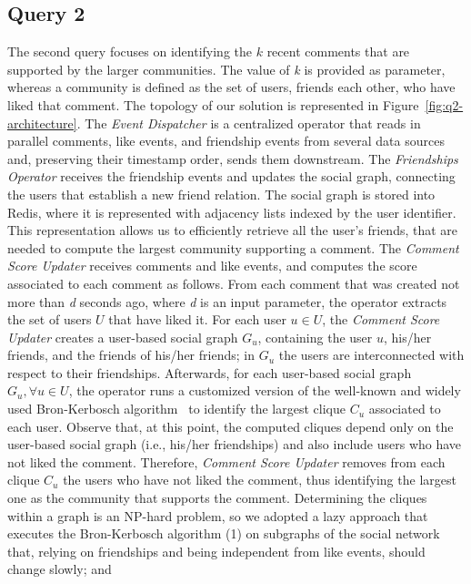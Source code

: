 \subsection{Query 2}
\label{sec:solution-q2}

The second query focuses on identifying the $ k $ recent comments that are supported by the larger communities.
The value of \textit{k} is provided as parameter, whereas a community is defined as the set of users, friends each other, who have liked that comment. 
% 
The topology of our solution is represented in Figure~\ref{fig:q2-architecture}. 
%
The \textit{Event Dispatcher} is a centralized operator that reads in parallel comments, like events, and friendship events from several data sources and, preserving their timestamp order, sends them downstream.
%
The \textit{Friendships Operator} receives the friendship events and updates the social graph, connecting the users that establish a new friend relation. 
The social graph is stored into Redis, where it is represented with adjacency lists indexed by the user identifier.
%
This representation allows us to efficiently retrieve all the user's friends, that are needed to compute the largest community supporting a comment. 
%
The \textit{Comment Score Updater} receives comments and like events, and computes the score associated to each comment as follows. 
%
From each comment that was created not more than \textit{d} seconds ago, where \textit{d} is an input parameter, the operator extracts the set of users $ U $ that have liked it. 
%
For each user $ u \in U $, the \textit{Comment Score Updater} creates a user-based social graph $ G_u $, containing the user $ u $, his/her friends, and the friends of his/her friends; in $ G_u $ the users are interconnected with respect to their friendships. 
%
Afterwards, for each user-based social graph $ G_u, \forall u \in U $, the operator runs a customized version of the well-known and widely used Bron-Kerbosch algorithm~\cite{BronKerbosch1973} to identify the largest clique $ C_u $ associated to each user.
%
Observe that, at this point, the computed cliques depend only on the user-based social graph (i.e., his/her friendships) and also include users who have not liked the comment. 
Therefore, \textit{Comment Score Updater} removes from each clique $ C_u $ the users who have not liked the comment, thus identifying the largest one as the community that supports the comment.
%
Determining the cliques within a graph is an NP-hard problem, so we adopted a lazy approach that executes the Bron-Kerbosch algorithm 
(1) on subgraphs of the social network that, relying on friendships and being independent from like events, should change slowly; and
